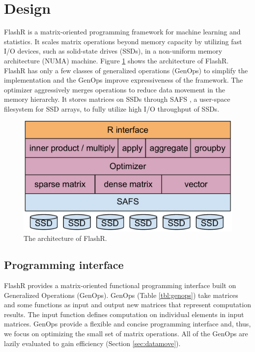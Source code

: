 \section{Design}

FlashR is a matrix-oriented programming framework for machine learning and
statistics. It scales matrix operations beyond memory capacity by utilizing
fast I/O devices, such as solid-state drives (SSDs), in a non-uniform memory
architecture (NUMA) machine. Figure \ref{fig:arch} shows the architecture of
FlashR. FlashR has only a few classes of generalized operations (GenOps) to
simplify the implementation and the GenOps improve expressiveness of the framework. 
The optimizer aggressively merges operations to
reduce data movement in the memory hierarchy.
It stores matrices on SSDs through SAFS \cite{safs},
a user-space filesystem for SSD arrays, to fully utilize high I/O
throughput of SSDs.

\begin{figure}
\centering
\includegraphics[scale=0.3]{FlashMatrix_figs/architecture.pdf}
\vspace{-5pt}
\caption{The architecture of FlashR.}
\label{fig:arch}
\vspace{-10pt}
\end{figure}

\subsection{Programming interface}

FlashR provides a matrix-oriented functional programming interface built
on Generalized Operations (GenOps).  GenOps (Table \ref{tbl:genops}) take matrices and
some functions as input and output new matrices that represent computation results.
The input function defines computation on individual elements in input matrices.
GenOps provide a flexible and concise programming interface and, thus,
we focus on optimizing the small set of matrix operations. All of
the GenOps are lazily evaluated to gain efficiency (Section
\ref{sec:datamove}).

